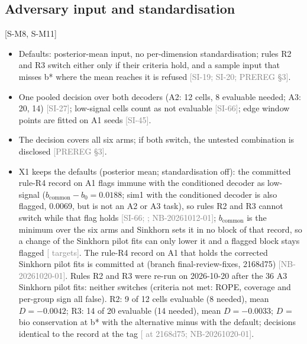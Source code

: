 \documentclass[11pt]{article}
\newcommand{\src}[1]{{\scriptsize\textcolor{gray}{[#1]}}}
\begin{document}
\subsection{Adversary input and standardisation}
[S-M8, S-M11]
\begin{itemize}
\item Defaults: posterior-mean input, no per-dimension standardisation; rules R2 and R3 switch either only if their criteria hold, and a sample input that misses b* where the mean reaches it is refused \src{SI-19; SI-20; PREREG \S3}.
\item One pooled decision over both decoders (A2: 12 cells, 8 evaluable needed; A3: 20, 14) \src{SI-27}; low-signal cells count as not evaluable \src{SI-66}; edge window points are fitted on A1 seeds \src{SI-45}.
\item The decision covers all six arms; if both switch, the untested combination is disclosed \src{PREREG \S3}.
\item X1 keeps the defaults (posterior mean; standardisation off): the committed rule-R4 record on A1 flags immune with the conditioned decoder as low-signal ($b_{\mathrm{common}} - b_0 = 0.0188$; sim1 with the conditioned decoder is also flagged, 0.0069, but is not an A2 or A3 task), so rules R2 and R3 cannot switch while that flag holds \src{SI-66; ; NB-20261012-01}; $b_{\mathrm{common}}$ is the minimum over the six arms and Sinkhorn sets it in no block of that record, so a change of the Sinkhorn pilot fits can only lower it and a flagged block stays flagged \src{ targets}. The rule-R4 record on A1 that holds the corrected Sinkhorn pilot fits is committed at  (branch final-review-fixes, 2168d75) \src{NB-20261020-01}. Rules R2 and R3 were re-run on 2026-10-20 after the 36 A3 Sinkhorn pilot fits: neither switches (criteria not met: ROPE, coverage and per-group sign all false). R2: 9 of 12 cells evaluable (8 needed), mean $D = -0.0042$; R3: 14 of 20 evaluable (14 needed), mean $D = -0.0033$; $D$ = bio conservation at b* with the alternative minus with the default; decisions identical to the record at the tag \src{ at 2168d75; NB-20261020-01}.
\end{itemize}
\end{document}
